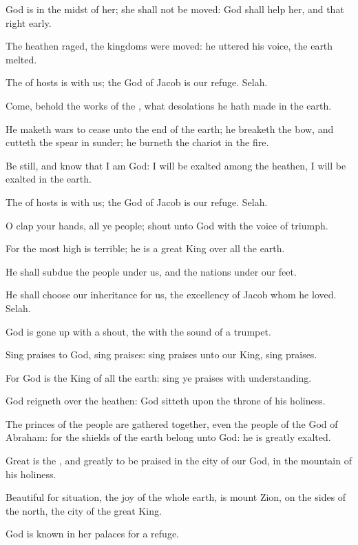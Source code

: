 \Verse God is in the midst of her; she shall not be moved: God shall help her, and that right early.

\Verse The heathen raged, the kingdoms were moved: he uttered his voice, the earth melted.

\Verse The \LORD of hosts is with us; the God of Jacob is our refuge.  Selah.

\Verse Come, behold the works of the \LORD, what desolations he hath made in the earth.

\Verse He maketh wars to cease unto the end of the earth; he breaketh the bow, and cutteth the spear in sunder; he burneth the chariot in the fire.

\Verse Be still, and know that I am God: I will be exalted among the heathen, I will be exalted in the earth.

\Verse The \LORD of hosts is with us; the God of Jacob is our refuge.  Selah.




\Chapter
\Verse O clap your hands, all ye people; shout unto God with the voice of triumph.

\Verse For the \LORD most high is terrible; he is a great King over all the earth.

\Verse He shall subdue the people under us, and the nations under our feet.

\Verse He shall choose our inheritance for us, the excellency of Jacob whom he loved. Selah.

\Verse God is gone up with a shout, the \LORD with the sound of a trumpet.

\Verse Sing praises to God, sing praises: sing praises unto our King, sing praises.

\Verse For God is the King of all the earth: sing ye praises with understanding.

\Verse God reigneth over the heathen: God sitteth upon the throne of his holiness.

\Verse The princes of the people are gathered together, even the people of the God of Abraham: for the shields of the earth belong unto God: he is greatly exalted.




\Chapter
\Verse Great is the \LORD, and greatly to be praised in the city of our God, in the mountain of his holiness.

\Verse Beautiful for situation, the joy of the whole earth, is mount Zion, on the sides of the north, the city of the great King.

\Verse God is known in her palaces for a refuge.

